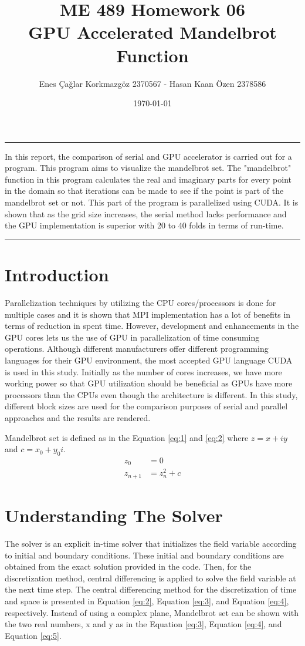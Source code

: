 \documentclass[12pt]{article}
\title{ME 489 Homework 06 \\ GPU Accelerated Mandelbrot Function}
\date{\today}
\author{Enes Çağlar Korkmazgöz 2370567 - Hasan Kaan Özen 2378586}
\renewenvironment{abstract}
{\quotation
  {\large\bfseries\abstractname\centering\par\noindent\rule{\linewidth}{.5pt}\medskip}
  \noindent}
{\par\noindent\rule{\linewidth}{.5pt}\endquotation}
\begin{document}
\maketitle

\begin{abstract}
In this report, the comparison of serial and GPU accelerator is carried out for a program. This program aims to visualize the mandelbrot set. The "mandelbrot" function in this program calculates the real and imaginary parts for every point in the domain so that iterations can be made to see if the point is part of the mandelbrot set or not. This part of the program is parallelized using CUDA. It is shown that as the grid size increases, the serial method lacks performance and the GPU implementation is superior with 20 to 40 folds in terms of run-time. 
\end{abstract}

\newpage
\tableofcontents
\newpage
\section{Introduction}

\noindent
Parallelization techniques by utilizing the CPU cores/processors is done for multiple cases and it is shown that MPI implementation has a lot of benefits in terms of reduction in spent time. However, development and enhancements in the GPU cores lets us the use of GPU in parallelization of time consuming operations. Although different manufacturers offer different programming languages for their GPU environment, the most accepted GPU language CUDA is used in this study. Initially as the number of cores increases, we have more working power so that GPU utilization should be beneficial as GPUs have more processors than the CPUs even though the architecture is different. In this study, different block sizes are used for the comparison purposes of serial and parallel approaches and the results are rendered.

Mandelbrot set is defined as in the Equation \ref{eq:1} and \ref{eq:2} where $ z = x+iy $ and $ c = x_0 + y_0i $.
\begin{align}
\label{eq:1}
z_0 &= 0 \\
\label{eq:2}
z_{n+1} &= z_n^2 + c
\end{align}

\section{Understanding The Solver}
\label{sec:2}
 The solver is an explicit in-time solver that initializes the field variable according to initial and boundary conditions. These initial and boundary conditions are obtained from the exact solution provided in the code. Then, for the discretization method, central differencing is applied to solve the field variable at the next time step. The central differencing method for the discretization of time and space is presented in Equation \ref{eq:2}, Equation \ref{eq:3}, and Equation \ref{eq:4}, respectively.
 \noindent
 Instead of using a complex plane, Mandelbrot set can be shown with the two real numbers, x and y as in the Equation \ref{eq:3}, Equation \ref{eq:4}, and Equation \ref{eq:5}.
 
\end{document}
